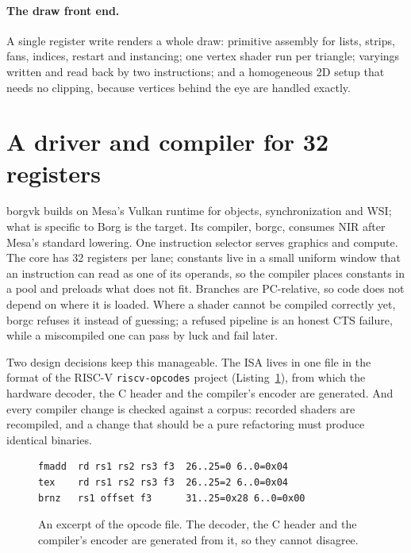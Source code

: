 \documentclass[sigconf,nonacm]{acmart}
\begin{document}
\paragraph{The draw front end.}
A single register write renders a whole draw: primitive assembly for
lists, strips, fans, indices, restart and instancing; one vertex shader run
per triangle; varyings written and read back by two instructions; and a
homogeneous 2D setup that needs no clipping, because vertices behind the
eye are handled exactly.

\section{A driver and compiler for 32 registers}

borgvk builds on Mesa's Vulkan runtime for objects, synchronization and
WSI; what is specific to Borg is the target. Its compiler, borgc, consumes
NIR after Mesa's standard lowering.
One instruction selector serves graphics and compute. The core has 32
registers per lane; constants live in a small uniform window that an
instruction can read as one of its operands, so the compiler places
constants in a pool and preloads what does not fit. Branches are
PC-relative, so code does not depend on where it is loaded. Where a shader
cannot be compiled correctly yet, borgc refuses it instead of guessing; a
refused pipeline is an honest CTS failure, while a miscompiled one can
pass by luck and fail later.

Two design decisions keep this manageable. The ISA lives in one file in
the format of the RISC-V \texttt{riscv-opcodes} project
(Listing~\ref{lst:opcodes}), from which the hardware decoder, the C
header and the compiler's encoder are generated. And every compiler change
is checked against a corpus: recorded shaders are recompiled, and a change
that should be a pure refactoring must produce identical binaries.

\begin{figure}[t]
\small
\begin{verbatim}
fmadd  rd rs1 rs2 rs3 f3  26..25=0 6..0=0x04
tex    rd rs1 rs2 rs3 f3  26..25=2 6..0=0x04
brnz   rs1 offset f3      31..25=0x28 6..0=0x00
\end{verbatim}
\caption{An excerpt of the opcode file. The decoder, the C header and the
  compiler's encoder are generated from it, so they cannot disagree.}
\label{lst:opcodes}
\end{figure}
\end{document}
